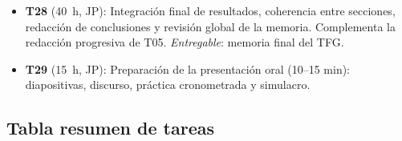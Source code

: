\documentclass[11pt, a4paper]{article}
\begin{document}
\begin{itemize}[nosep, leftmargin=1.2em, itemsep=2pt]
    \item \textbf{T28} (40~h, JP): Integración final de resultados, coherencia entre secciones, redacción de conclusiones y revisión global de la memoria. Complementa la redacción progresiva de T05. \textit{Entregable}: memoria final del TFG.
    \item \textbf{T29} (15~h, JP): Preparación de la presentación oral (10--15 min): diapositivas, discurso, práctica cronometrada y simulacro.
\end{itemize}

\subsection{Tabla resumen de tareas}
\end{document}
